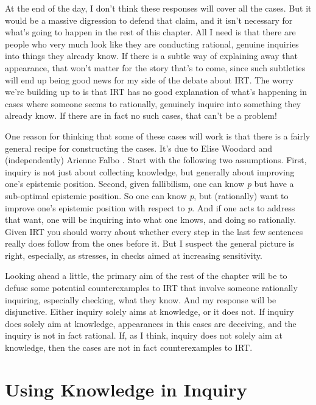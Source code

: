 \documentclass[
  11pt,
]{book}
\begin{document}
At the end of the day, I don't think these responses will cover all the cases. But it would be a massive digression to defend that claim, and it isn't necessary for what's going to happen in the rest of this chapter. All I need is that there are people who very much look like they are conducting rational, genuine inquiries into things they already know. If there is a subtle way of explaining away that appearance, that won't matter for the story that's to come, since such subtleties will end up being good news for my side of the debate about IRT. The worry we're building up to is that IRT has no good explanation of what's happening in cases where someone seems to rationally, genuinely inquire into something they already know. If there are in fact no such cases, that can't be a problem!

One reason for thinking that some of these cases will work is that there is a fairly general recipe for constructing the cases. It's due to Elise Woodard \citeyearpar{Woodard2021} and (independently) Arienne Falbo \citeyearpar{Falbo2021}. Start with the following two assumptions. First, inquiry is not just about collecting knowledge, but generally about improving one's epistemic position. Second, given fallibilism, one can know \emph{p} but have a sub-optimal epistemic position. So one can know \emph{p}, but (rationally) want to improve one's epistemic position with respect to \emph{p}. And if one acts to address that want, one will be inquiring into what one knows, and doing so rationally. Given IRT you should worry about whether every step in the last few sentences really does follow from the ones before it. But I suspect the general picture is right, especially, as \citet{Melchior2019} stresses, in checks aimed at increasing sensitivity.

Looking ahead a little, the primary aim of the rest of the chapter will be to defuse some potential counterexamples to IRT that involve someone rationally inquiring, especially checking, what they know. And my response will be disjunctive. Either inquiry solely aims at knowledge, or it does not. If inquiry does solely aim at knowledge, appearances in this cases are deceiving, and the inquiry is not in fact rational. If, as I think, inquiry does not solely aim at knowledge, then the cases are not in fact counterexamples to IRT.

\hypertarget{irtinquiry}{%
\section{Using Knowledge in Inquiry}\label{irtinquiry}}
\end{document}
